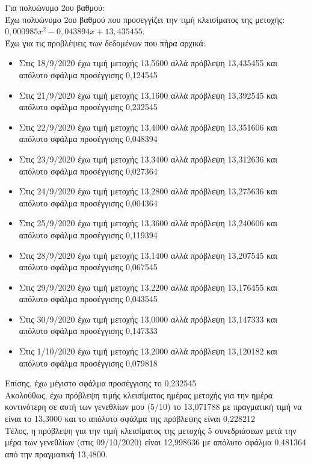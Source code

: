 \documentclass[a4paper,11pt]{article}
\newcommand{\lt}{\latintext}
\begin{document}
\par 
Για πολυώνυμο 2ου βαθμού:\\

Έχω πολυώνυμο 2ου βαθμού που προσεγγίζει την τιμή κλεισίματος της μετοχής: {\lt $0,000985x^2 - 0,043894x + 13,435455$}.\\

Έχω για τις προβλέψεις των δεδομένων που πήρα αρχικά:
\begin{itemize}
    \item Στις 18/9/2020 έχω τιμή μετοχής 13,5600 αλλά πρόβλεψη 13,435455 και απόλυτο σφάλμα προσέγγισης 0,124545
    \item Στις 21/9/2020 έχω τιμή μετοχής 13,1600 αλλά πρόβλεψη 13,392545 και απόλυτο σφάλμα προσέγγισης 0,232545
    \item Στις 22/9/2020 έχω τιμή μετοχής 13,4000 αλλά πρόβλεψη 13,351606 και απόλυτο σφάλμα προσέγγισης 0,048394
    \item Στις 23/9/2020 έχω τιμή μετοχής 13,3400 αλλά πρόβλεψη 13,312636 και απόλυτο σφάλμα προσέγγισης 0,027364
    \item Στις 24/9/2020 έχω τιμή μετοχής 13,2800 αλλά πρόβλεψη 13,275636 και απόλυτο σφάλμα προσέγγισης 0,004364
    \item Στις 25/9/2020 έχω τιμή μετοχής 13,3600 αλλά πρόβλεψη 13,240606 και απόλυτο σφάλμα προσέγγισης 0,119394
    \item Στις 28/9/2020 έχω τιμή μετοχής 13,1400 αλλά πρόβλεψη 13,207545 και απόλυτο σφάλμα προσέγγισης 0,067545
    \item Στις 29/9/2020 έχω τιμή μετοχής 13,2200 αλλά πρόβλεψη 13,176455 και απόλυτο σφάλμα προσέγγισης 0,043545
    \item Στις 30/9/2020 έχω τιμή μετοχής 13,0000 αλλά πρόβλεψη 13,147333 και απόλυτο σφάλμα προσέγγισης 0,147333
    \item Στις 1/10/2020 έχω τιμή μετοχής 13,2000 αλλά πρόβλεψη 13,120182 και απόλυτο σφάλμα προσέγγισης 0,079818
\end{itemize}
Επίσης, έχω μέγιστο σφάλμα προσέγγισης το 0,232545\\

Ακολούθως, έχω πρόβλεψη τιμής κλεισίματος ημέρας μετοχής για την ημέρα κοντινότερη σε αυτή των γενεθλίων μου (5/10) το 13,071788 με πραγματική τιμή να είναι το 13,3000 και το απόλυτο σφάλμα της πρόβλεψης είναι 0,228212\\

Τέλος, η πρόβλεψη για την τιμή κλεισίματος της μετοχής 5 συνεδριάσεων μετά την μέρα των γενεθλίων (στις 09/10/2020) είναι 12,998636 με απόλυτο σφάλμα 0,481364 από την πραγματική 13,4800.\\
\end{document}
